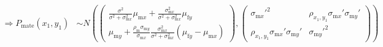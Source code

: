 \documentclass{article}
\newcommand{\x}[1]{\text{#1}}
\begin{document}
\begin{landscape}
\begin{align*}
\\ \Rightarrow P_\text{mate}(x_1,y_1)&\sim N\left(\left(\begin{array}{cc}\frac{\sigma^2}{\sigma^2+\sigma_{\x{m}x}^2}\mu_{\x{m}x}+\frac{\sigma_{\x{m}x}^2}{\sigma^2+\sigma_{\x{m}x}^2}\mu_{\x{f}y} \\  \mu_{\x{m}y}+\frac{\rho_\x{m}\sigma_{\x{m}y}}{\sigma_{\x{m}x}}\frac{\sigma_{\x{m}x}^2}{\sigma^2+\sigma_{\x{m}x}^2}(\mu_{\x{f}y}-\mu_{\x{m}x})\end{array}\right),\left(\begin{array}{cc}\sigma_{\x{m}x}'^2 & \rho_{x_1,y_1}\sigma_{\x{m}x}'\sigma_{\x{m}y}' \\\rho_{x_1,y_1}\sigma_{\x{m}x}'\sigma_{\x{m}y}'& \sigma_{\x{m}y}'^2 \end{array}\right)\right)
\end{align*}


\end{landscape}
\end{document}
